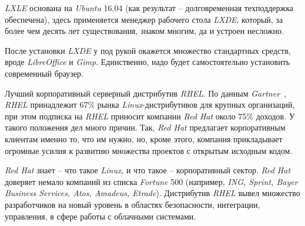 \textit{LXLE} основана на \textit{Ubuntu} 16.04 (как результат – долговременная техподдержка обеспечена), здесь применяется менеджер рабочего стола \textit{LXDE}, который, за более чем десять лет существования, знаком многим, да и устроен несложно.

После установки \textit{LXDE} у под рукой окажется множество стандартных средств, вроде \textit{LibreOffice} и \textit{Gimp}. Единственно, надо будет самостоятельно установить современный браузер.

Лучший корпоративный серверный дистрибутив \textit{RHEL}. По данным \textit{Gartner}~\cite{linuxOffDoc}, \textit{RHEL} принадлежит 67\% рынка \textit{Linux}-дистрибутивов для крупных организаций, при этом подписка на \textit{RHEL} приносит компании \textit{Red Hat} около 75\% доходов. У такого положения дел много причин. Так, \textit{Red Hat} предлагает корпоративным клиентам именно то, что им нужно, но, кроме этого, компания прикладывает огромные усилия к развитию множества проектов с открытым исходным кодом.

\textit{Red Hat} знает – что такое \textit{Linux}, и что такое – корпоративный сектор. \textit{Red Hat} доверяет немало компаний из списка \textit{Fortune} 500 (например, \textit{ING, Sprint, Bayer Business Services, Atos, Amadeus, Etrade}). Дистрибутив \textit{RHEL} вывел множество разработчиков на новый уровень в областях безопасности, интеграции, управления, в сфере работы с облачными системами.


